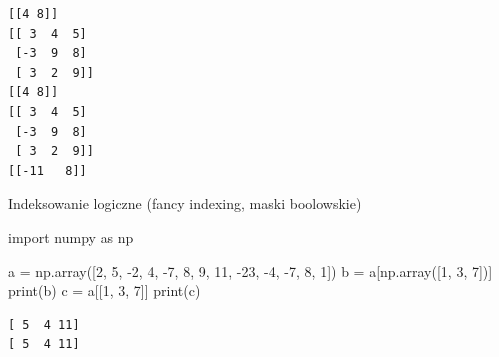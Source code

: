 \documentclass[
  letterpaper,
  DIV=11,
  numbers=noendperiod]{scrreprt}
\newenvironment{Shaded}{\begin{snugshade}}{\end{snugshade}}
\newcommand{\BuiltInTok}[1]{\textcolor[rgb]{0.00,0.23,0.31}{#1}}
\newcommand{\DecValTok}[1]{\textcolor[rgb]{0.68,0.00,0.00}{#1}}
\newcommand{\ImportTok}[1]{\textcolor[rgb]{0.00,0.46,0.62}{#1}}
\newcommand{\NormalTok}[1]{\textcolor[rgb]{0.00,0.23,0.31}{#1}}
\newcommand{\OperatorTok}[1]{\textcolor[rgb]{0.37,0.37,0.37}{#1}}
\begin{document}
\begin{verbatim}
[[4 8]]
[[ 3  4  5]
 [-3  9  8]
 [ 3  2  9]]
[[4 8]]
[[ 3  4  5]
 [-3  9  8]
 [ 3  2  9]]
[[-11   8]]
\end{verbatim}

Indeksowanie logiczne (fancy indexing, maski boolowskie)

\begin{Shaded}
\begin{Highlighting}[]
\ImportTok{import}\NormalTok{ numpy }\ImportTok{as}\NormalTok{ np}

\NormalTok{a }\OperatorTok{=}\NormalTok{ np.array([}\DecValTok{2}\NormalTok{, }\DecValTok{5}\NormalTok{, }\OperatorTok{{-}}\DecValTok{2}\NormalTok{, }\DecValTok{4}\NormalTok{, }\OperatorTok{{-}}\DecValTok{7}\NormalTok{, }\DecValTok{8}\NormalTok{, }\DecValTok{9}\NormalTok{, }\DecValTok{11}\NormalTok{, }\OperatorTok{{-}}\DecValTok{23}\NormalTok{, }\OperatorTok{{-}}\DecValTok{4}\NormalTok{, }\OperatorTok{{-}}\DecValTok{7}\NormalTok{, }\DecValTok{8}\NormalTok{, }\DecValTok{1}\NormalTok{])}
\NormalTok{b }\OperatorTok{=}\NormalTok{ a[np.array([}\DecValTok{1}\NormalTok{, }\DecValTok{3}\NormalTok{, }\DecValTok{7}\NormalTok{])]}
\BuiltInTok{print}\NormalTok{(b)}
\NormalTok{c }\OperatorTok{=}\NormalTok{ a[[}\DecValTok{1}\NormalTok{, }\DecValTok{3}\NormalTok{, }\DecValTok{7}\NormalTok{]]}
\BuiltInTok{print}\NormalTok{(c)}
\end{Highlighting}
\end{Shaded}

\begin{verbatim}
[ 5  4 11]
[ 5  4 11]
\end{verbatim}
\end{document}
